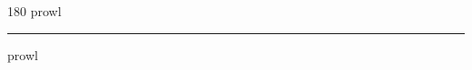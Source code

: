 
\begin{frame}
\begin{center}
\begin{turn}{180}
{\fontsize{2.5cm}{1em}\selectfont prowl}
\end{turn}
\vspace{1em}\par  
\hrule
\vspace{1em}\par  
{\fontsize{2.5cm}{1em}\selectfont prowl}
\end{center}
\end{frame}
